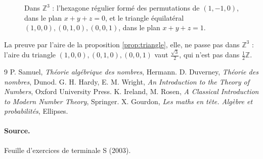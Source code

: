 \documentclass[11pt,a4paper]{article}
\theoremstyle{plain}
\theoremstyle{definition}
\theoremstyle{remark}
\newcommand{\Z}{\mathbb{Z}}
\begin{document}
\begin{figure}[h]
\centering
{}
\caption{Dans $\mathbb{Z}^3$ : l'hexagone régulier formé des permutations de $(1,-1,0)$, dans le plan $x+y+z=0$, et le triangle équilatéral $(1,0,0),(0,1,0),(0,0,1)$, dans le plan $x+y+z=1$.}\label{fig:hexagone3d}
\end{figure}

La preuve par l'aire de la proposition \ref{prop:triangle}, elle, ne passe pas dans $\Z^3$ : l'aire du triangle $(1,0,0),(0,1,0),(0,0,1)$ vaut $\frac{\sqrt3}2$, qui n'est pas dans $\frac12\Z$.

\begin{thebibliography}{9}
 P. Samuel, \emph{Théorie algébrique des nombres}, Hermann.
 D. Duverney, \emph{Théorie des nombres}, Dunod.
 G. H. Hardy, E. M. Wright, \emph{An Introduction to the Theory of Numbers}, Oxford University Press.
 K. Ireland, M. Rosen, \emph{A Classical Introduction to Modern Number Theory}, Springer.
 X. Gourdon, \emph{Les maths en tête. Algèbre et probabilités}, Ellipses.
\end{thebibliography}

\paragraph{Source.} Feuille d'exercices de terminale S (2003).
\end{document}
